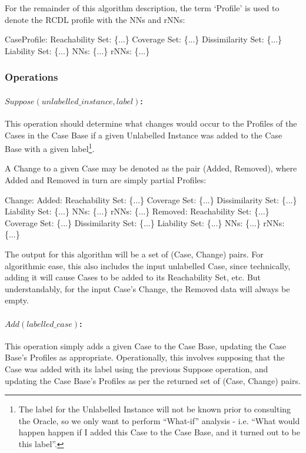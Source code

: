 \documentclass[a4paper,11pt]{report}
\begin{document}
\begin{samepage}
For the remainder of this algorithm description, the term `Profile' is used to denote the RCDL profile with the NNs and rNNs:
\nopagebreak[4]
\begin{code}[numbers=none,frame=none]
CaseProfile:  
  Reachability Set:  \{...\}
  Coverage Set:      \{...\}
  Dissimilarity Set: \{...\}
  Liability Set:     \{...\}
  NNs:               \{...\}
  rNNs:              \{...\}
\end{code}
\end{samepage}
\subsubsection{Operations\label{sec:incralgstructops}}
\paragraph{$Suppose(unlabelled\_instance, label)$:}
This operation should determine what changes would occur to the Profiles of the Cases in the Case Base if a given Unlabelled Instance was added to the Case Base with a given label\footnote{The label for the Unlabelled Instance will not be known prior to consulting the Oracle, so we only want to perform ``What-if'' analysis - i.e. ``What would happen happen if I added this Case to the Case Base, and it turned out to be this label''.}.

A Change to a given Case may be denoted as the pair (Added, Removed), where Added and Removed in turn are simply partial Profiles:
\begin{code}[numbers=none,frame=none]
Change:
  Added:
    Reachability Set:  \{...\}
    Coverage Set:      \{...\}
    Dissimilarity Set: \{...\}
    Liability Set:     \{...\}
    NNs:               \{...\}
    rNNs:              \{...\}
  Removed:
    Reachability Set:  \{...\}
    Coverage Set:      \{...\}
    Dissimilarity Set: \{...\}
    Liability Set:     \{...\}
    NNs:               \{...\}
    rNNs:              \{...\}
\end{code}

The output for this algorithm will be a set of (Case, Change) pairs. For algorithmic ease, this also includes the input unlabelled Case, since technically, adding it will cause Cases to be added to its Reachability Set, etc. But understandably, for the input Case's Change, the Removed data will always be empty.

\paragraph{$Add(labelled\_case)$:}
This operation simply adds a given Case to the Case Base, updating the Case Base's Profiles as appropriate. Operationally, this involves supposing that the Case was added with its label using the previous Suppose operation, and updating the Case Base's Profiles as per the returned set of (Case, Change) pairs.
\end{document}
